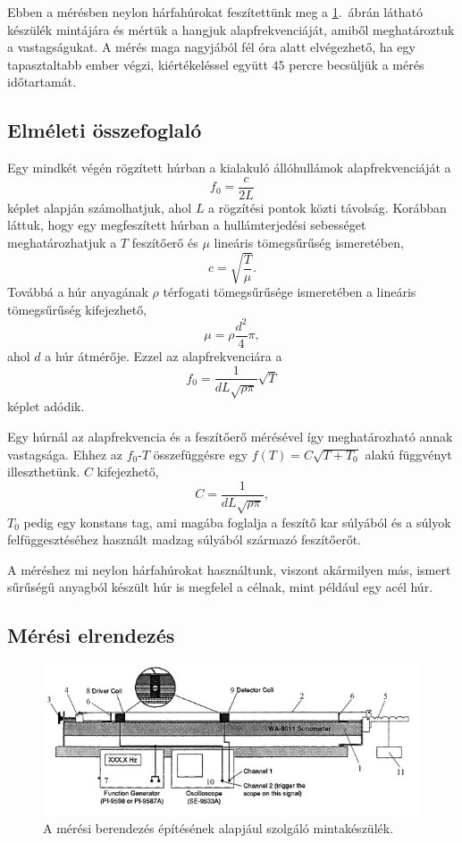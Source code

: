 \documentclass[a4paper,12pt]{article}
\begin{document}
Ebben a mérésben neylon hárfahúrokat feszítettünk meg a \ref{muszer_abra}.\ ábrán látható készülék mintájára és mértük a hangjuk alapfrekvenciáját, amiből meghatároztuk a vastagságukat. A mérés maga nagyjából fél óra alatt elvégezhető, ha egy tapasztaltabb ember végzi, kiértékeléssel együtt $45$ percre becsüljük a mérés időtartamát.

\subsection{Elméleti összefoglaló}

Egy mindkét végén rögzített húrban a kialakuló állóhullámok alapfrekvenciáját a
$$ f_0 = \frac{c}{2 L} $$
képlet alapján számolhatjuk, ahol $L$ a rögzítési pontok közti távolság. Korábban láttuk, hogy egy megfeszített húrban a hullámterjedési sebességet meghatározhatjuk a $T$ feszítőerő és $\mu$ lineáris tömegsűrűség ismeretében,
$$ c = \sqrt{\frac{T}{\mu}}. $$
Továbbá a húr anyagának $\rho$ térfogati tömegsűrűsége ismeretében a lineáris tömegsűrűség kifejezhető,
$$ \mu = \rho \frac{d^2}{4} \pi, $$
ahol $d$ a húr átmérője. Ezzel az alapfrekvenciára a
$$ f_0 = \frac{1}{d L \sqrt{\rho \pi}} \sqrt{T} $$
képlet adódik.

Egy húrnál az alapfrekvencia és a feszítőerő mérésével így meghatározható annak vastagsága. Ehhez az $f_0$-$T$ összefüggésre egy $f(T) = C \sqrt{T + T_0}$ alakú függvényt illeszthetünk. $C$ kifejezhető,
$$ C = \frac{1}{d L \sqrt{\rho \pi}}, $$
$T_0$ pedig egy konstans tag, ami magába foglalja a feszítő kar súlyából és a súlyok felfüggesztéséhez használt madzag súlyából származó feszítőerőt.

A méréshez mi neylon hárfahúrokat használtunk, viszont akármilyen más, ismert sűrűségű anyagból készült húr is megfelel a célnak, mint például egy acél húr.

\subsection{Mérési elrendezés}

\begin{figure}[h!]
\centering
\includegraphics[width =.6\textwidth]{berendezes1.png}
\caption{A mérési berendezés építésének alapjául szolgáló mintakészülék. \cite{mintamuszer}}
\label{muszer_abra}
\end{figure}
\end{document}
